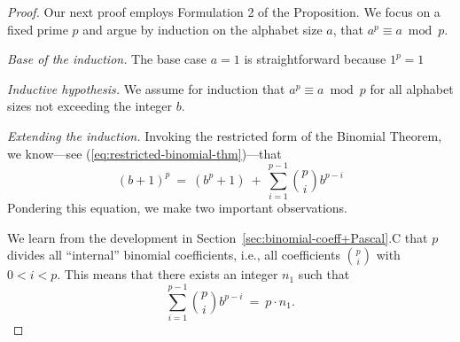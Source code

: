 \begin{proof}
Our next proof employs Formulation 2 of the Proposition.  We focus on
a fixed prime $p$ and argue by induction on the alphabet size $a$,
that $a^{p} \equiv a \bmod p$.

\noindent
{\it Base of the induction.}
The base case $a=1$ is straightforward because $1^{p} = 1$

\noindent
{\it Inductive hypothesis.}
We assume for induction that $a^{p} \equiv a \bmod p$ for all alphabet
sizes not exceeding the integer $b$.

\noindent
{\it Extending the induction.}
Invoking the restricted form of the Binomial Theorem,
we know---see (\ref{eq:restricted-binomial-thm})---that
\begin{equation}
\label{eq:FLT-0}
(b+1)^p \ = \ \left( b^p + 1 \right) \ + \
 \sum_{i=1}^{p-1} {p \choose i} b^{p-i}
\end{equation}
Pondering this equation, we make two important observations.

We learn from the development in
Section~\ref{sec:binomial-coeff+Pascal}.C that $p$ divides all
``internal'' binomial coefficients, i.e., all coefficients
$\displaystyle {p \choose i}$ with $0 < i < p$.  This means that there
exists an integer $n_1$ such that
\begin{equation}
\label{eq:FLT-1}
 \sum_{i=1}^{p-1} {p \choose i} b^{p-i} \ = \ p \cdot n_1.
\end{equation}

\bigskip

\noindent {}

\bigskip


\end{proof}
